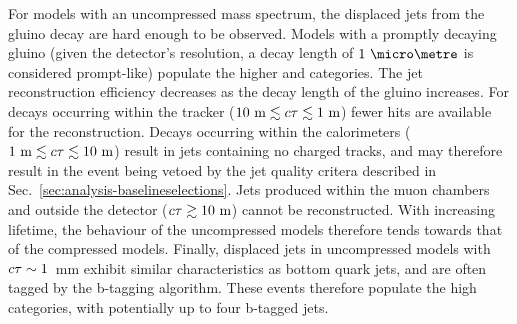 For models with an uncompressed mass spectrum, the displaced jets from the 
gluino decay are hard enough to be observed. Models with a promptly decaying 
gluino (given the detector's resolution, a decay length of $1~\micro\metre$ is 
considered 
prompt-like) populate the higher \njet and \scalht categories. The jet 
reconstruction efficiency decreases as the decay length of the gluino 
increases. For decays occurring within the tracker ($10~\mathrm{m} \lesssim 
c\tau \lesssim 1~\mathrm{m}$) 
fewer hits are available for the reconstruction. 
Decays occurring within the calorimeters ($1~\mathrm{m} \lesssim c\tau \lesssim 
10~\mathrm{m}$) 
result in jets containing no charged tracks, and may therefore 
result in the event being vetoed by the jet quality critera described in 
Sec.~\ref{sec:analysis-baselineselections}. Jets produced within the muon 
chambers and outside the detector ($c\tau \gtrsim 10~\mathrm{m}$) cannot be 
reconstructed. With increasing lifetime, the behaviour of the uncompressed 
models therefore tends towards that of the compressed models. Finally, 
displaced jets in uncompressed models with $c\tau \sim 1$~mm exhibit similar 
characteristics as bottom quark jets, and are often tagged by the b-tagging 
algorithm. These events therefore populate the high \nb categories, with 
potentially up to four b-tagged jets.





